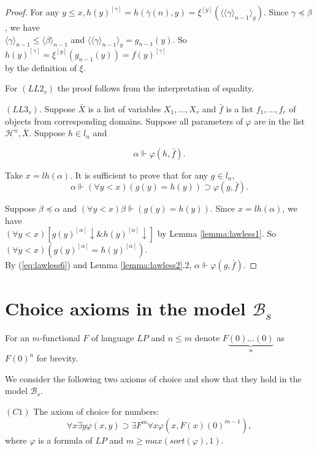 \documentclass{asl}
\theoremstyle{definition}
\begin{document}
\begin{proof}
For any $ y\leqslant x,h(y)^{[\gamma]}=h\left(\bar{\gamma}(n),y \right)=\xi^{[y]}\left( \langle\langle\gamma\rangle_{n-1}\rangle_y\right)$. Since $ \gamma\preccurlyeq\beta $, we have
\medskip\\
$\langle\gamma\rangle_{n-1} \leqslant \langle\beta\rangle_{n-1}$ and $\langle\langle\gamma\rangle_{n-1}\rangle_y=g_{n-1}(y) $. So $h(y)^{[\gamma]}=\xi^{[y]}(g_{n-1}(y))=f(y)^{[\gamma]}$
\smallskip
\\by the definition of $ \xi $.
\medskip

For $(LL2_s)$ the proof follows from the interpretation of equality.
\medskip

$(LL3_s)$. Suppose $ \bar{X} $ is a list of variables $ X_1,\ldots,X_r $ and $ \bar{f} $ is a list $ f_1,\ldots,f_r $ of objects from corresponding domains. Suppose all parameters of $ \varphi $ are in the list $\mathcal{H}^n, \bar{X} $. Suppose $h\in l_{n}$ and 

\begin{equation}
\alpha\Vdash\varphi(h,\bar{f}). \label{eq:lawless6}
\end{equation}

Take $ x=lh(\alpha) $. It is sufficient to prove that for any $ g\in l_{n}$, 
\[ \alpha\Vdash (\forall y < x)\left(g(y)=h(y)\right) \supset \varphi(g,\bar{f}) . \]

Suppose $ \beta\preccurlyeq \alpha$ and $ (\forall y<x)\beta\Vdash (g(y)=h(y))$. Since $ x=lh(\alpha) $, we have
\medskip\\
$(\forall y<x) \left[ g(y)^{[\alpha]}\downarrow \& h(y)^{[\alpha]}\downarrow\right]$ by Lemma \ref{lemma:lawless1}. 
So $(\forall y<x)\left( g(y)^{[\alpha]}=h(y)^{[\alpha]}\right)$.
\medskip\\
By (\ref{eq:lawless6}) and Lemma \ref{lemma:lawless2}.2, $ \alpha\Vdash \varphi(g,\bar{f})$.
\end{proof}

\section{Choice axioms in the model $\mathcal{B}_s$}
For an $m$-functional $ F$ of language $LP$ and $n\leqslant m$ denote  $F\underbrace{(0)\ldots(0)}_n$ as $ F(0)^n$ for brevity.
\medskip

We consider the following two axioms of choice and show that they hold in the model $\mathcal{B}_s$.

$ (C1) $ The axiom of choice for numbers:
\[ \forall x\exists y \varphi(x,y)\supset\exists F^m\forall x\varphi(x,F(x)(0)^{m-1}), \] 
where $ \varphi $ is a formula of $ LP $ and $m \geqslant max(sort(\varphi),1) $.
\bigskip
\end{document}
